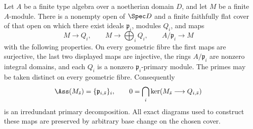 \begin{proposition}
\label{prop:relative-primary-models}
Let \(A\) be a finite type algebra over a noetherian domain \(D\), and
let \(M\) be a finite \(A\)-module.  There is a nonempty open of
\(\Spec D\) and a finite faithfully flat cover of that open on which
there exist ideals \(\mathfrak p_i\), modules \(Q_i\), and maps
\[
 M\longrightarrow Q_i,\qquad
 M\longrightarrow\bigoplus_i Q_i,\qquad
 A/\mathfrak p_i\longrightarrow M
\]
with the following properties.  On every geometric fibre the first
maps are surjective, the last two displayed maps are injective, the
rings \(A/\mathfrak p_i\) are nonzero integral domains, and each
\(Q_i\) is a nonzero \(\mathfrak p_i\)-primary module.  The primes
may be taken distinct on every geometric fibre.  Consequently
\[
 \Ass(M_{\bar s})=\{\mathfrak p_{i,\bar s}\}_i,
 \qquad
 0=\bigcap_i\ker(M_{\bar s}\longrightarrow Q_{i,\bar s})
\]
is an irredundant primary decomposition.  All exact diagrams used to
construct these maps are preserved by arbitrary base change on the
chosen cover.
\end{proposition}
